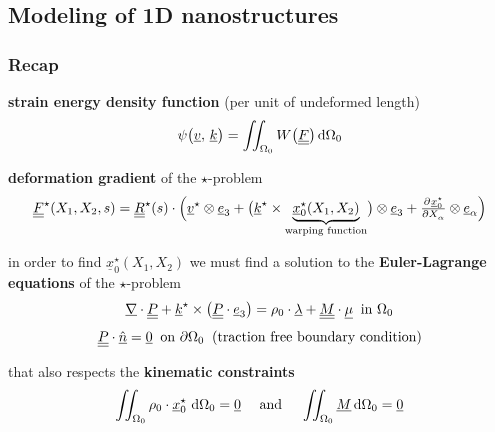 \subsection{Modeling of 1D nanostructures}

\begin{frame}
  \frametitle{Recap}

  \textbf{strain energy density function} (per unit of undeformed length)
  \begin{displaymath}
    \psi \bigl( \underline{v} , \, \underline{k} \bigr) =
    \iint_{\Omega_0} W \bigl( \doubleunderline{F} \bigr) \dif \Omega_0
  \end{displaymath}
  
  \textbf{deformation gradient} of the $\star$-problem
  \begin{displaymath}
    \doubleunderline{F}^{\star}(X_1,X_2,s) =
    \doubleunderline{R}^{\star}(s) \cdot \Bigl(
      \underline{v}^{\star} \otimes \underline{e}_3 +
      \bigl( \underline{k}^{\star} \times \underbrace{ \underline{x}_0^{\star}(X_1,X_2) }_{\text{warping function}} \bigr) \otimes \underline{e}_3 +
      \pd{\underline{x}_0^{\star}}{X_{\alpha}} \otimes \underline{e}_{\alpha}
    \Bigr)
  \end{displaymath}
  
  in order to find $\underline{x}_0^{\star}(X_1,X_2)$ we must find a solution to the
  \textbf{Euler-Lagrange equations} of the $\star$-problem
  \begin{displaymath}
    \underline{\nabla} \cdot \underline{\underline{P}} +
    \underline{k}^{\star} \times \bigl( \underline{\underline{P}} \cdot \underline{e}_3 \bigr) =
    \rho_0 \cdot \underline{\lambda} +
    \underline{\underline{M}} \cdot \underline{\mu}
    \: \text{ in } \Omega_0    
  \end{displaymath}
  \begin{displaymath}
    \underline{\underline{P}} \cdot \underline{\hat{n}} = \underline{0}
    \: \text{ on } \partial \Omega_0
    \: \text{ (traction free boundary condition)}
  \end{displaymath}
  
  \vspace{0.5em}
  that also respects the \textbf{kinematic constraints}
  \begin{displaymath}
    \iint_{\Omega_0} \rho_0 \cdot \underline{x}_0^{\star} \, \dif \Omega_0 = \underline{0}
    \quad \text{ and } \quad
    \iint_{\Omega_0} \underline{M} \dif \Omega_0 = \underline{0}
  \end{displaymath}

\end{frame}


